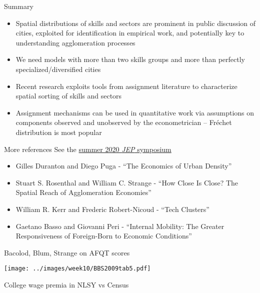 \documentclass[11pt,notes=hide,aspectratio=169]{beamer}
\newcommand{\beginbackup}{
   \newcounter{framenumbervorappendix}
   \setcounter{framenumbervorappendix}{\value{framenumber}}
}
\begin{document}
\begin{frame}{Summary}
\begin{itemize}
	\item Spatial distributions of skills and sectors are prominent in public discussion of cities, exploited for identification in empirical work, and potentially key to understanding agglomeration processes
	\item We need models with more than two skills groups and more than perfectly specialized/diversified cities
	\item Recent research exploits tools from assignment literature to characterize spatial sorting of skills and sectors
	\item Assignment mechanisms can be used in quantitative work via assumptions on components observed and unobserved by the econometrician -- Fr\'{e}chet distribution is most popular
\end{itemize}
\end{frame}
\begin{frame}{More references}
See the \href{https://www.aeaweb.org/issues/602}{summer 2020 \textit{JEP} symposium}
\begin{itemize}
\item Gilles Duranton and Diego Puga - ``The Economics of Urban Density''
\item Stuart S. Rosenthal and William C. Strange - ``How Close Is Close? The Spatial Reach of Agglomeration Economies''
\item William R. Kerr and Frederic Robert-Nicoud - ``Tech Clusters''
\item Gaetano Basso and Giovanni Peri - ``Internal Mobility: The Greater Responsiveness of Foreign-Born to Economic Conditions''
\end{itemize}
\end{frame}
\beginbackup
\begin{frame}{Bacolod, Blum, Strange on AFQT scores}
\hypertarget{BBS2009tab5}{}
\begin{center}\texttt{[image: ../images/week10/BBS2009tab5.pdf]}\end{center}
\vspace{-5mm}
\hyperlink{NLSY_main}{\beamerreturnbutton}
\end{frame}
\begin{frame}{College wage premia in NLSY vs Census}
\hypertarget{BSPvsCensus}{}

\hyperlink{NLSY_main}{\beamerreturnbutton}
\end{frame}
\end{document}
